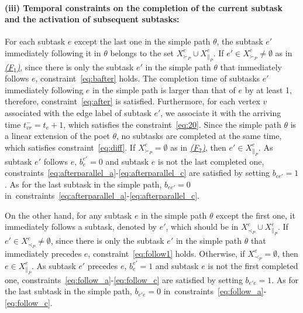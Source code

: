 \documentclass[Afour,sageh,times]{sagej}
\begin{document}
{\paragraph{(iii) Temporal constraints on the completion of the
current subtask and the activation of subsequent
subtasks:}
For each subtask $e$ except the last one in the simple path $\theta$, the subtask $e'$ immediately following it in $\theta$ belongs to the set $X_{\succ_P}^e \cup X_{\|_P}^e$. If $e' \in X_{\succ_P}^e \neq \emptyset$ as in \hyperref[activation:a]{\it (F$_1$)}, since there is only the subtask $e'$ in the simple path $\theta$ that immediately follows $e$, constraint~\eqref{eq:bafter} holds. The completion time  of subtasks $e'$ immediately following  $e$ in the simple path is larger than that of $e$ by at least 1, therefore, constraint~\eqref{eq:after} is satisfied. %
Furthermore, for each vertex $v$ associated with the edge label of subtask $e'$, we associate it with the arriving time $t_{vr}^- = t_{e}+1$, which satisfies the constraint~\eqref{eq:20}. Since the simple path $\theta$ is a linear extension of the poet $\theta$, no subtasks are completed at the same time, which satisfies constraint~\eqref{eq:diff}. If $X_{\succ_P}^e = \emptyset$ as in \hyperref[activation:b]{\it (F$_2$)}, then $e' \in X_{\|_P}^e$. As subtask $e'$ follows $e$, $b_e^{e'}=0$ and  subtask $e$ is not the last completed one, constraints~\eqref{eq:afterparallel_a}-\eqref{eq:afterparallel_c} are satisfied by setting $b_{ee'}=1$.  As for the last subtask in the simple path, $b_{ee'}=0$  in~constraints~\eqref{eq:afterparallel_a}-\eqref{eq:afterparallel_c}.

On the other hand, for any subtask $e$ in the simple path $\theta$ except the first one, it immediately follows a subtask, denoted by $e'$, which should be in $X_{\prec_P}^e \cup X_{\|_P}^e$. If $e'\in  X_{\prec_P}^e \neq \emptyset$, since there is only the subtask $e'$ in the simple path $\theta$ that immediately precedes $e$, constraint~\eqref{eq:follow1} holds. Otherwise, if $X_{\prec_P}^e = \emptyset$, then $e \in X_{\|_P}^e$. As subtask $e'$ precedes $e$, $b_e^{e'}=1$ and subtask $e$ is not the first completed one, constraints~\eqref{eq:follow_a}-\eqref{eq:follow_c} are satisfied by setting $b_{e'e}=1$.  As for the last subtask in the simple path, $b_{e'e}=0$ in~constraints~\eqref{eq:follow_a}-\eqref{eq:follow_c}.

}
\end{document}
